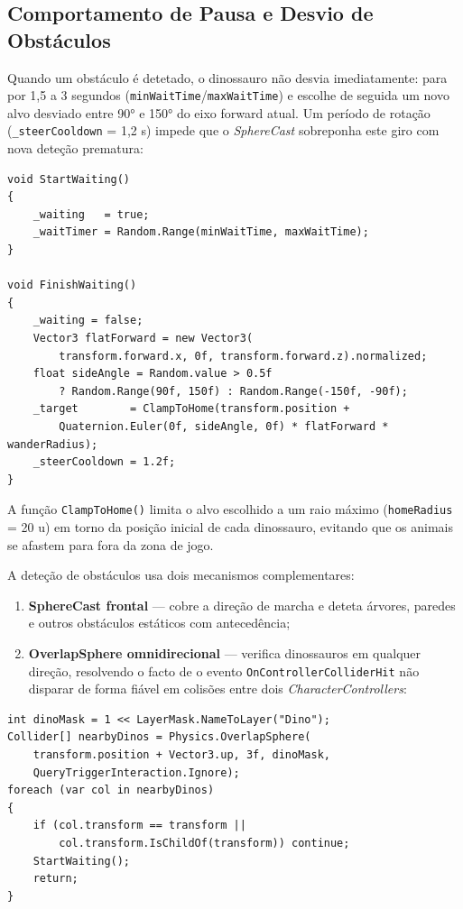 \documentclass[a4paper,11pt]{report}
\newcommand{\code}[1]{\texttt{#1}}
\begin{document}
\subsection{Comportamento de Pausa e Desvio de Obstáculos}

Quando um obstáculo é detetado, o dinossauro não desvia imediatamente: para
por 1{,}5 a 3 segundos (\code{minWaitTime}/\code{maxWaitTime}) e escolhe de
seguida um novo alvo desviado entre 90° e 150° do eixo forward atual. Um
período de rotação (\code{\_steerCooldown} = 1{,}2 s) impede que o
\textit{SphereCast} sobreponha este giro com nova deteção prematura:

\begin{lstlisting}[caption={Pausa e escolha de direção lateral após obstáculo (RaptorWander.cs).},
                   label={lst:wanderwait}]
void StartWaiting()
{
    _waiting   = true;
    _waitTimer = Random.Range(minWaitTime, maxWaitTime);
}

void FinishWaiting()
{
    _waiting = false;
    Vector3 flatForward = new Vector3(
        transform.forward.x, 0f, transform.forward.z).normalized;
    float sideAngle = Random.value > 0.5f
        ? Random.Range(90f, 150f) : Random.Range(-150f, -90f);
    _target        = ClampToHome(transform.position +
        Quaternion.Euler(0f, sideAngle, 0f) * flatForward * wanderRadius);
    _steerCooldown = 1.2f;
}
\end{lstlisting}

A função \code{ClampToHome()} limita o alvo escolhido a um raio máximo
(\code{homeRadius} = 20 u) em torno da posição inicial de cada dinossauro,
evitando que os animais se afastem para fora da zona de jogo.

A deteção de obstáculos usa dois mecanismos complementares:

\begin{enumerate}
    \setlength\itemsep{0pt}
    \item \textbf{SphereCast frontal} --- cobre a direção de marcha e deteta
          árvores, paredes e outros obstáculos estáticos com antecedência;
    \item \textbf{OverlapSphere omnidirecional} --- verifica dinossauros
          em qualquer direção, resolvendo o facto de o evento
          \code{OnControllerColliderHit} não disparar de forma fiável
          em colisões entre dois \textit{CharacterControllers}:
\end{enumerate}

\begin{lstlisting}[caption={Deteção omnidirecional de outros dinossauros por OverlapSphere.},
                   label={lst:overlapsphere}]
int dinoMask = 1 << LayerMask.NameToLayer("Dino");
Collider[] nearbyDinos = Physics.OverlapSphere(
    transform.position + Vector3.up, 3f, dinoMask,
    QueryTriggerInteraction.Ignore);
foreach (var col in nearbyDinos)
{
    if (col.transform == transform ||
        col.transform.IsChildOf(transform)) continue;
    StartWaiting();
    return;
}
\end{lstlisting}
\end{document}
